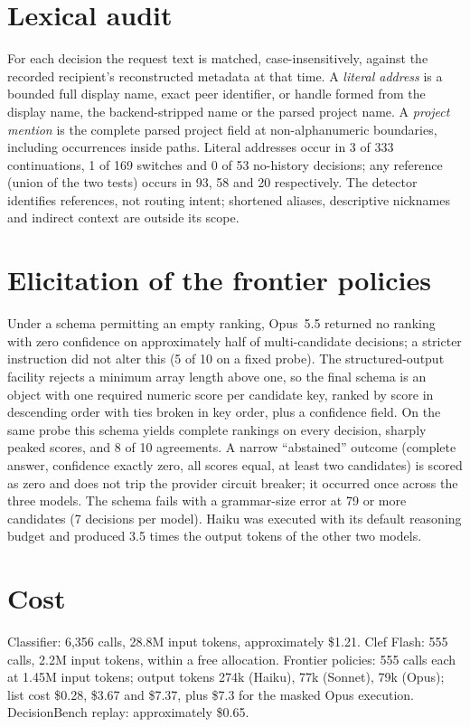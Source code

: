 \documentclass[11pt]{article}
\theoremstyle{definition}
\begin{document}
\section{Lexical audit}
\label{app:lexical}

For each decision the request text is matched, case-insensitively, against the recorded recipient's reconstructed metadata at that time. A \emph{literal address} is a bounded full display name, exact peer identifier, or handle formed from the display name, the backend-stripped name or the parsed project name. A \emph{project mention} is the complete parsed project field at non-alphanumeric boundaries, including occurrences inside paths. Literal addresses occur in 3 of 333 continuations, 1 of 169 switches and 0 of 53 no-history decisions; any reference (union of the two tests) occurs in 93, 58 and 20 respectively. The detector identifies references, not routing intent; shortened aliases, descriptive nicknames and indirect context are outside its scope.

\section{Elicitation of the frontier policies}
\label{app:elicitation}

Under a schema permitting an empty ranking, Opus~5.5 returned no ranking with zero confidence on approximately half of multi-candidate decisions; a stricter instruction did not alter this (5 of 10 on a fixed probe). The structured-output facility rejects a minimum array length above one, so the final schema is an object with one required numeric score per candidate key, ranked by score in descending order with ties broken in key order, plus a confidence field. On the same probe this schema yields complete rankings on every decision, sharply peaked scores, and 8 of 10 agreements. A narrow ``abstained'' outcome (complete answer, confidence exactly zero, all scores equal, at least two candidates) is scored as zero and does not trip the provider circuit breaker; it occurred once across the three models. The schema fails with a grammar-size error at 79 or more candidates (7 decisions per model). Haiku was executed with its default reasoning budget and produced 3.5 times the output tokens of the other two models.

\section{Cost}
\label{app:cost}

Classifier: 6,356 calls, 28.8M input tokens, approximately \$1.21. Clef Flash: 555 calls, 2.2M input tokens, within a free allocation. Frontier policies: 555 calls each at 1.45M input tokens; output tokens 274k (Haiku), 77k (Sonnet), 79k (Opus); list cost \$0.28, \$3.67 and \$7.37, plus \$7.3 for the masked Opus execution. DecisionBench replay: approximately \$0.65.
\end{document}
